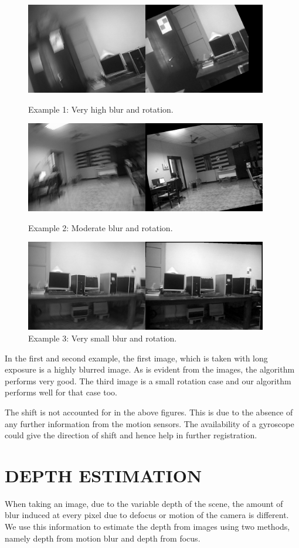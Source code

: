 \documentclass[BTech]{iitmdiss}
\begin{document}
\begin{figure}[H]
\begin{center}
\includegraphics[width=300pt]{images/imreg/rotation/eg1/imreg.png}
\caption{Example 1: Very high blur and rotation.}
\includegraphics[width=300pt]{images/imreg/rotation/eg2/imreg.png}
\caption{Example 2: Moderate blur and rotation.}
\includegraphics[width=300pt]{images/imreg/rotation/eg3/imreg.png}
\caption{Example 3: Very small blur and rotation.}
\label{fig:rotate_reg}
\end{center}
\end{figure}

In the first
and second example, the first image, which is taken with long exposure
is a highly blurred image. As is evident from the images, the algorithm
performs very good. The third image is a small rotation case and our
algorithm performs well for that case too.

The shift is not accounted for in the above figures. This is due to the
absence of any further information from the motion sensors. The availability
of a gyroscope could give the direction of shift and hence help in 
further registration.

\pagebreak
\chapter{DEPTH ESTIMATION}
\label{chap:depth_estimation}
When taking an image, due to the variable depth of the scene, the amount 
of blur induced at every pixel due to defocus or motion of the camera is different. We use this information to estimate the depth from images using
two methods, namely depth from motion blur and depth from focus.
\end{document}
